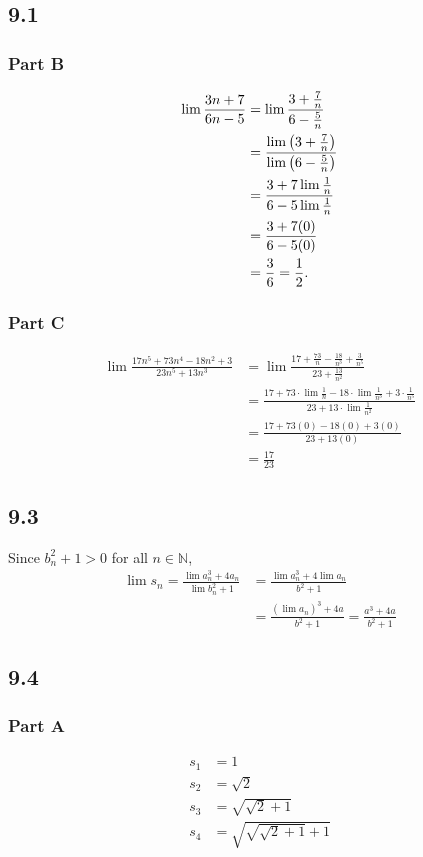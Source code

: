 \documentclass[12pt,titlepage]{extarticle}
\begin{document}
\subsection*{9.1}
\subsubsection*{Part B}
\begin{align*}
    \lim \frac{3n+7}{6n-5} &= \lim \frac{3 + \frac{7}{n}}{6 - \frac{5}{n}} \\
    &= \frac{\lim\qty(3 + \frac{7}{n})}{\lim\qty(6 - \frac{5}{n})} \\
    &= \frac{3 + 7 \lim \frac{1}{n}}{6 - 5 \lim \frac{1}{n}} \\
    &= \frac{3 + 7(0)}{6 - 5(0)} \\
    &= \frac{3}{6} = \frac{1}{2}.
\end{align*}

\subsubsection*{Part C}
\begin{align*}
    \lim \frac{17n^5 + 73n^4 -18n^2 + 3}{23n^5 + 13n^3} &= \lim\frac{17 + \frac{73}{n} - \frac{18}{n^3} + \frac{3}{n^5}}{23 + \frac{13}{n^2}} \\
    &= \frac{17 + 73 \cdot \lim \frac{1}{n} - 18\cdot \lim \frac{1}{n^3} + 3\cdot \frac{1}{n^5}}{23 + 13\cdot\lim \frac{1}{n^2}} \\
    &= \frac{17 + 73(0) - 18(0) + 3(0)}{23 + 13(0)} \\
    &= \frac{17}{23}
\end{align*}

\subsection*{9.3}
Since $b_n^2 + 1 > 0$ for all $n \in \mathbb{N}$,
\begin{align*}
    \lim s_n = \frac{\lim a_n^3 + 4 a_n}{\lim b_n^2 + 1} &= \frac{\lim a_n^3 + 4 \lim a_n}{b^2 + 1} \\
    &= \frac{(\lim a_n)^3 + 4a}{b^2 + 1} = \frac{a^3 + 4a}{b^2 + 1}
\end{align*}

\subsection*{9.4}
\subsubsection*{Part A}
\begin{align*}
    s_1 &= 1 \\
    s_2 &= \sqrt{2} \\
    s_3 &= \sqrt{\sqrt{2} + 1} \\
    s_4 &= \sqrt{\sqrt{\sqrt{2} + 1} + 1} \\
\end{align*}
\end{document}
